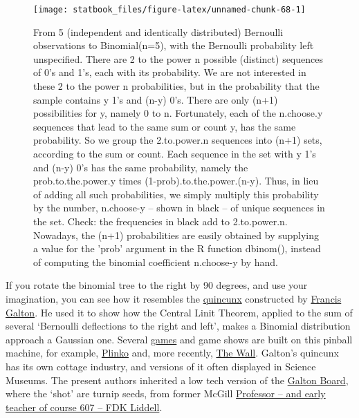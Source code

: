 \documentclass[]{book}
\begin{document}
\begin{figure}

\texttt{[image: statbook\_files/figure-latex/unnamed-chunk-68-1]} \hfill{}

\caption{From 5 (independent and identically distributed) Bernoulli observations to Binomial(n=5), with the Bernoulli probability left unspecified. There are 2 to the power n possible (distinct) sequences of 0's and 1's, each with its probability. We are not interested in these 2 to the power n probabilities, but in the probability that the sample  contains y 1's and (n-y) 0's. There are only (n+1) possibilities for y, namely 0 to n. Fortunately, each of the n.choose.y sequences that lead to the same sum or count y, has the same probability. So we group the 2.to.power.n sequences into (n+1) sets, according to the sum or count. Each sequence in the set with  y 1's and (n-y) 0's has the same probability, namely  the prob.to.the.power.y times (1-prob).to.the.power.(n-y). Thus, in lieu of adding all such probabilities, we simply multiply this  probability by the number, n.choose-y -- shown in black -- of unique sequences in the set. Check: the frequencies in black add to 2.to.power.n. Nowadays, the (n+1) probabilities are easily obtained by supplying a value for the 'prob' argument in the R function dbinom(), instead of  computing the binomial coefficient n.choose-y by hand.}\label{fig:unnamed-chunk-68}
\end{figure}

If you rotate the binomial tree to the right by 90 degrees, and use your imagination, you can see how it resembles the \href{https://en.wikipedia.org/wiki/Quincunx}{quincunx} constructed by \href{https://en.wikipedia.org/wiki/Bean_machine}{Francis Galton}. He used it to show how the Central Linit Theorem, applied to the sum of several `Bernoulli deflections to the right and left', makes a Binomial distribution approach a Gaussian one. Several \href{https://en.wikipedia.org/wiki/Bean_machine\#Games}{games} and game shows are built on this pinball machine, for example, \href{https://fivethirtyeight.com/features/what-if-god-were-a-giant-game-of-plinko/}{Plinko} and, more recently, \href{https://www.nbc.com/the-wall?nbc=1}{The Wall}.
Galton's quincunx has its own cottage industry, and versions of it often displayed in Science Museums. The present authors inherited a low tech version of the \href{http://www.galtonboard.com}{Galton Board}, where the `shot' are turnip seeds, from former McGill \href{https://www.mcgill.ca/medicine/staff-resources/inmemoriam/2003}{Professor -- and early teacher of course 607 -- FDK Liddell}.
\end{document}
